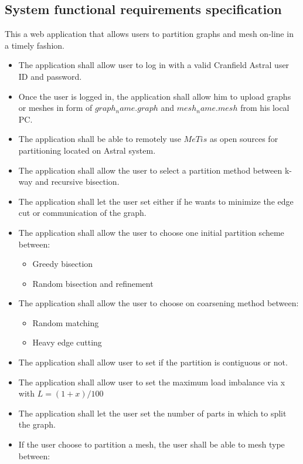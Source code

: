 \documentclass{cranfieldChart}
\begin{document}
\subsection{System functional requirements specification}
This a web application that allows users to partition graphs and mesh on-line in a timely fashion. 
\begin{itemize}
    \item The application shall allow user to log in with a valid Cranfield Astral user ID and password. 
    \item Once the user is logged in, the application shall allow him to upload graphs or meshes in form of $graph_name.graph$ and $mesh_name.mesh$ from his local PC. 
    \item The application shall be able to remotely use $MeTis$ as open sources for partitioning located on Astral system. 
    \item The application shall allow the user to select a partition method between k-way and recursive bisection.
     \item The application shall let the user set either if he wants to minimize the edge cut or communication of the graph.
    \item The application shall allow the user to choose one initial partition scheme between:
        \begin{itemize}
             \item Greedy bisection
            \item Random bisection and refinement 
        \end{itemize}
    \item The application shall allow the user to choose on coarsening method between: 
        \begin{itemize}
            \item Random matching 
            \item Heavy edge cutting 
        \end{itemize}
    \item The application shall allow user to set if the partition is contiguous or not. 
    \item The application shall allow user to set the maximum load imbalance via x with $L= (1+x)/100$
    \item The application shall let the user set the number of parts in which to split the graph. 
    \item If the user choose to partition a mesh, the user shall be able to mesh type between: 
    \begin{itemize}

\end{itemize}
\end{itemize}
\end{document}
